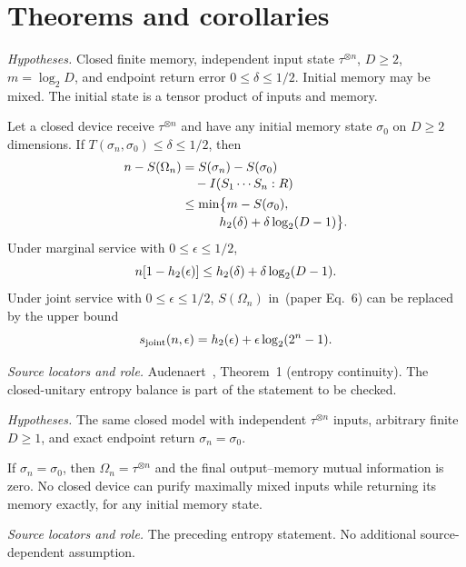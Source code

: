 \documentclass[11pt]{article}
\begin{document}
\newpage
\section*{Theorems and corollaries}

\par\medskip
\noindent\begin{minipage}{\linewidth}
\emph{Hypotheses.} Closed finite memory, independent input state $\tau^{\otimes n}$, $D\ge2$, $m=\log_2D$, and endpoint return error $0\le\delta\le1/2$. Initial memory may be mixed. The initial state is a tensor product of inputs and memory.

\begin{theorem}
Let a closed device receive $\tau^{\otimes n}$ and have any initial memory state $\sigma_0$ on $D\ge2$ dimensions. If $T(\sigma_n,\sigma_0)\le\delta\le1/2$, then
\begin{equation}
 \begin{aligned}
 n-S(\Omega_n)
 &= S(\sigma_n)-S(\sigma_0)\\[-2pt]
 &\quad-I(S_1\cdots S_n:R)\\
 &\le\min\bigl\{m-S(\sigma_0),\\[-2pt]
 &\qquad\quad h_2(\delta)+\delta\log_2(D-1)\bigr\}.
 \end{aligned}
\end{equation}
Under marginal service with $0\le\epsilon\le1/2$,
\begin{equation}
 n[1-h_2(\epsilon)]\le h_2(\delta)+\delta\log_2(D-1).
\end{equation}
Under joint service with $0\le\epsilon\le1/2$, $S(\Omega_n)$ in~(paper Eq.~6) can be replaced by the upper bound
\begin{equation}
 s_{\rm joint}(n,\epsilon)=h_2(\epsilon)+\epsilon\log_2(2^n-1).
\end{equation}
\end{theorem}

\noindent\emph{Source locators and role.} Audenaert~\cite{audenaert}, Theorem~1 (entropy continuity). The closed-unitary entropy balance is part of the statement to be checked.
\end{minipage}
\par

\par\medskip
\noindent\begin{minipage}{\linewidth}
\emph{Hypotheses.} The same closed model with independent $\tau^{\otimes n}$ inputs, arbitrary finite $D\ge1$, and exact endpoint return $\sigma_n=\sigma_0$.

\begin{corollary}
If $\sigma_n=\sigma_0$, then $\Omega_n=\tau^{\otimes n}$ and the final output--memory mutual information is zero. No closed device can purify maximally mixed inputs while returning its memory exactly, for any initial memory state.
\end{corollary}

\noindent\emph{Source locators and role.} The preceding entropy statement. No additional source-dependent assumption.
\end{minipage}
\par
\end{document}
